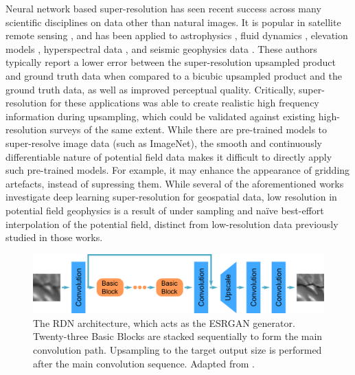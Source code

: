 \documentclass[manuscript.tex]{subfiles}
\begin{document}
Neural network based super-resolution has seen recent success across many scientific disciplines on data other than natural images.
It is popular in satellite remote sensing \parencite[e.g.][]{lanarasSuperresolutionSentinel2Images2018,wangUltradenseGANSatellite2019}, and has been applied to astrophysics \parencite[e.g.][]{jungbluthSingleframeSuperresolutionSolar2019,salvatelliUsingUNetsCreate2019}, fluid dynamics \parencite{bodeUsingPhysicsinformedEnhanced2021}, elevation models \parencite{leongDeepBedMapDeepNeural2020}, hyperspectral data \parencite[e.g.][]{arunCNNBasedSuperResolutionHyperspectral2020}, and seismic geophysics data \parencite[e.g.][]{liDeepLearningSimultaneous2021,wangDeeplearningbasedSeismicData2018,wangAdaptingResidualDense2022,yuDeepLearningDenoising2019}.
These authors typically report a lower error between the super-resolution upsampled product and ground truth data when compared to a bicubic upsampled product and the ground truth data, as well as improved perceptual quality.
Critically, super-resolution for these applications was able to create realistic high frequency information during upsampling, which could be validated against existing high-resolution surveys of the same extent.
While there are pre-trained models to super-resolve image data (such as ImageNet), the smooth and continuously differentiable nature of potential field data makes it difficult to directly apply such pre-trained models.
For example, it may enhance the appearance of gridding artefacts, instead of supressing them.
While several of the aforementioned works investigate deep learning super-resolution for geospatial data, low resolution in potential field geophysics is a result of under sampling and naïve best-effort interpolation of the potential field, distinct from low-resolution data previously studied in those works.

\begin{figure}[hbt]
    \includegraphics[width=\linewidth]{fig/p1/rdn.png}
    \caption[The RDN architecture]{The RDN architecture, which acts as the ESRGAN generator.
        Twenty-three Basic Blocks are stacked sequentially to form the main convolution path.
        Upsampling to the target output size is performed after the main convolution sequence.
        Adapted from \cite{wangESRGANEnhancedSuperresolution2018}.
    }
    \label{fig:rdn}
\end{figure}
\end{document}

